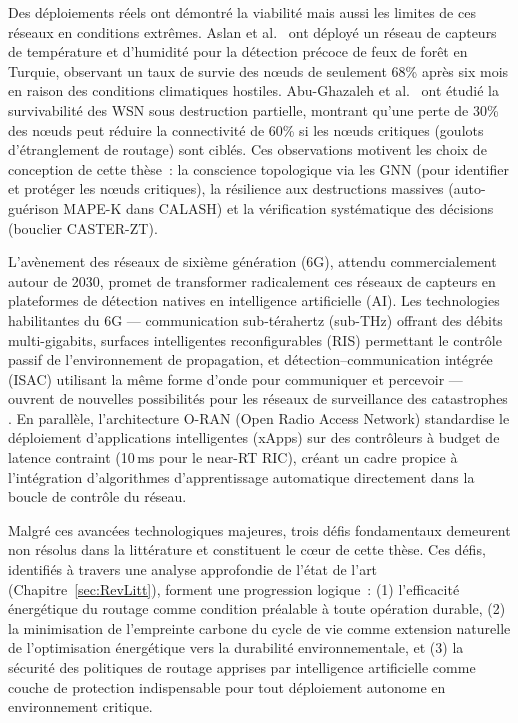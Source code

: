 Des déploiements réels ont démontré la viabilité mais aussi les limites de ces réseaux en conditions extrêmes. Aslan et al.\ \cite{Aslan2012ForestFireWSN} ont déployé un réseau de capteurs de température et d'humidité pour la détection précoce de feux de forêt en Turquie, observant un taux de survie des n\oe{}uds de seulement 68\% après six mois en raison des conditions climatiques hostiles. Abu-Ghazaleh et al.\ \cite{AbuGhazaleh2007WSNSurvivability} ont étudié la survivabilité des WSN sous destruction partielle, montrant qu'une perte de 30\% des n\oe{}uds peut réduire la connectivité de 60\% si les n\oe{}uds critiques (goulots d'étranglement de routage) sont ciblés. Ces observations motivent les choix de conception de cette thèse~: la conscience topologique via les GNN (pour identifier et protéger les n\oe{}uds critiques), la résilience aux destructions massives (auto-guérison MAPE-K dans CALASH) et la vérification systématique des décisions (bouclier CASTER-ZT).

L'avènement des réseaux de sixième génération (6G), attendu commercialement autour de 2030, promet de transformer radicalement ces réseaux de capteurs en plateformes de détection natives en intelligence artificielle (AI). Les technologies habilitantes du 6G --- communication sub-térahertz (sub-THz) offrant des débits multi-gigabits, surfaces intelligentes reconfigurables (RIS) permettant le contrôle passif de l'environnement de propagation, et détection--communication intégrée (ISAC) utilisant la même forme d'onde pour communiquer et percevoir --- ouvrent de nouvelles possibilités pour les réseaux de surveillance des catastrophes \cite{saad2020vision6g,etri_6g_disaster2024}. En parallèle, l'architecture O-RAN (Open Radio Access Network) standardise le déploiement d'applications intelligentes (xApps) sur des contrôleurs à budget de latence contraint (10\,ms pour le near-RT RIC), créant un cadre propice à l'intégration d'algorithmes d'apprentissage automatique directement dans la boucle de contrôle du réseau.

Malgré ces avancées technologiques majeures, trois défis fondamentaux demeurent non résolus dans la littérature et constituent le c\oe{}ur de cette thèse. Ces défis, identifiés à travers une analyse approfondie de l'état de l'art (Chapitre~\ref{sec:RevLitt}), forment une progression logique~: (1) l'efficacité énergétique du routage comme condition préalable à toute opération durable, (2) la minimisation de l'empreinte carbone du cycle de vie comme extension naturelle de l'optimisation énergétique vers la durabilité environnementale, et (3) la sécurité des politiques de routage apprises par intelligence artificielle comme couche de protection indispensable pour tout déploiement autonome en environnement critique.


